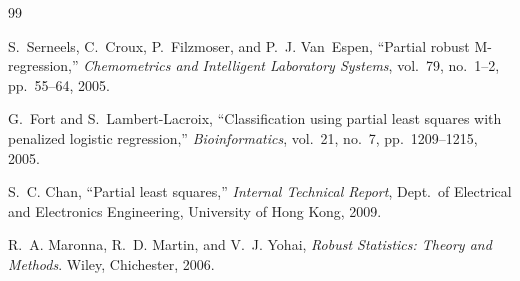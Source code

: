 \begin{singlespace}
\begingroup
\renewcommand{\chapter}[2]{}  %
\begin{thebibliography}{99}

S.~Serneels, C.~Croux, P.~Filzmoser, and P.~J. Van~Espen,
``Partial robust M-regression,''
\emph{Chemometrics and Intelligent Laboratory Systems}, vol.~79,
no.~1--2, pp.~55--64, 2005.

G.~Fort and S.~Lambert-Lacroix,
``Classification using partial least squares with penalized logistic regression,''
\emph{Bioinformatics}, vol.~21, no.~7, pp.~1209--1215, 2005.

S.~C. Chan,
``Partial least squares,''
\emph{Internal Technical Report}, Dept.\ of Electrical and Electronics Engineering,
University of Hong Kong, 2009.

R.~A. Maronna, R.~D. Martin, and V.~J. Yohai,
\emph{Robust Statistics: Theory and Methods}.
Wiley, Chichester, 2006.

\end{thebibliography}
\endgroup
\end{singlespace}
